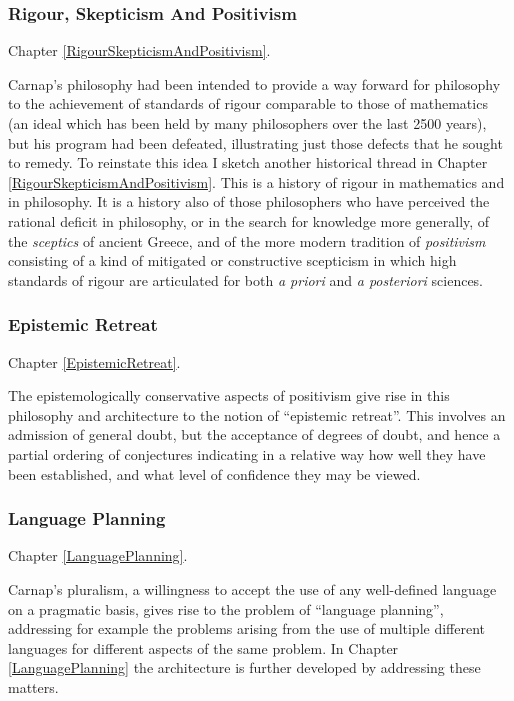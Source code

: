 \subsubsection{Rigour, Skepticism And Positivism}

Chapter \ref{RigourSkepticismAndPositivism}.

Carnap's philosophy had been intended to provide a way forward for
philosophy to the achievement of standards of rigour comparable to
those of mathematics (an ideal which has been held by many
philosophers over the last 2500 years), but his program had been
defeated, illustrating  just those defects that he sought to remedy.
To reinstate this idea I sketch another historical thread in Chapter \ref{RigourSkepticismAndPositivism}.
This is a history of rigour in mathematics and in philosophy.
It is a history also of those philosophers who have perceived the
rational deficit in philosophy, or in the search for knowledge more
generally, of the {\it sceptics} of ancient Greece, and of the more
modern tradition of {\it positivism} consisting of a kind of
mitigated or constructive scepticism in which high standards of rigour
are articulated for both {\it a priori} and {\it a posteriori} sciences.

\subsubsection{Epistemic Retreat}

Chapter \ref{EpistemicRetreat}.

The epistemologically conservative aspects of positivism give rise in
this philosophy and architecture to the notion of ``epistemic
retreat''.
This involves an admission of general doubt, but the acceptance of
degrees of doubt, and hence a partial ordering of conjectures
indicating in a relative way how well they have been established, and
what level of confidence they may be viewed.

\subsubsection{Language Planning}

Chapter \ref{LanguagePlanning}.

Carnap's pluralism, a willingness to accept the use of any
well-defined language on a pragmatic basis, gives rise to the problem
of ``language planning'', addressing for example the problems arising
from the use of multiple different languages for different aspects of
the same problem.
In Chapter \ref{LanguagePlanning} the architecture is further
developed by addressing these matters.

